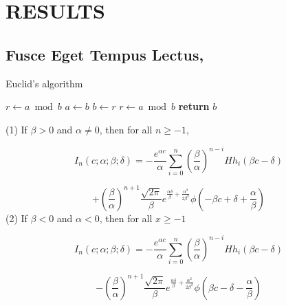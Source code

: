 \chapter{RESULTS} \label{results}

\section{Fusce Eget Tempus Lectus, }

\begin{algorithm}  {Euclid’s algorithm}
\singlespacing

\begin{algorithmic}[1]
\State $r\gets a\bmod b$
\State $a\gets b$
\State $b\gets r$
\State $r\gets a\bmod b$
\EndWhile\label{euclidendwhile}
\State \textbf{return} $b$
\EndProcedure
\end{algorithmic}
\end{algorithm}










(1) If $\beta>0$ and $\alpha\neq0$, then for all $n\geq-1$,

$$I_{n}(c;\alpha; \beta; \delta) = - \frac{e^{\alpha c}}{\alpha} \sum_{i=0}^{n}(\frac{\beta}{\alpha})^{n-i} Hh_{i}(\beta c -\delta)$$

$$+ (\frac{\beta}{\alpha})^{n+1} \frac{\sqrt{2 \pi}}{\beta} e^{\frac{\alpha \delta}{\beta}+\frac{\alpha^{2}}{2\beta^{2}}} \phi(-\beta c + \delta + \frac{\alpha}{\beta})$$
(2) If $\beta<0$ and $\alpha<0$, then for all $x \geq -1$

$$I_{n}(c;\alpha; \beta; \delta) = - \frac{e^{\alpha c}}{\alpha} \sum_{i=0}^{n}(\frac{\beta}{\alpha})^{n-i} Hh_{i}(\beta c -\delta)$$

$$- (\frac{\beta}{\alpha})^{n+1} \frac{\sqrt{2 \pi}}{\beta} e^{\frac{\alpha \delta}{\beta}+\frac{\alpha^{2}}{2\beta^{2}}} \phi(\beta c - \delta - \frac{\alpha}{\beta})$$

